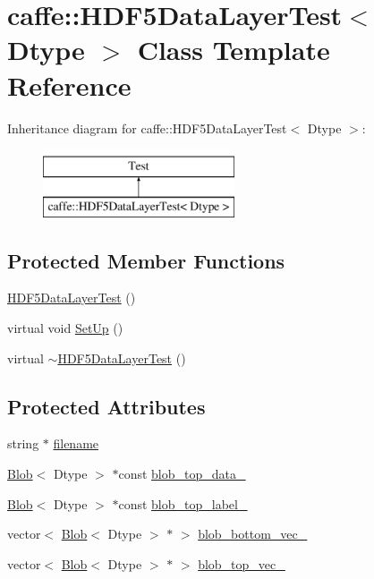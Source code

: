 \hypertarget{classcaffe_1_1_h_d_f5_data_layer_test}{\section{caffe\+:\+:H\+D\+F5\+Data\+Layer\+Test$<$ Dtype $>$ Class Template Reference}
\label{classcaffe_1_1_h_d_f5_data_layer_test}
}
Inheritance diagram for caffe\+:\+:H\+D\+F5\+Data\+Layer\+Test$<$ Dtype $>$\+:\begin{figure}[H]
\begin{center}
\leavevmode
\includegraphics[height=2.000000cm]{classcaffe_1_1_h_d_f5_data_layer_test}
\end{center}
\end{figure}
\subsection*{Protected Member Functions}
\begin{DoxyCompactItemize}
\item 
\hyperlink{classcaffe_1_1_h_d_f5_data_layer_test_a193e15cc2ccd1437aa0aa5096d5dfde6}{H\+D\+F5\+Data\+Layer\+Test} ()
\item 
virtual void \hyperlink{classcaffe_1_1_h_d_f5_data_layer_test_a87eaa2af48eba154aaf5a5429708c7b1}{Set\+Up} ()
\item 
virtual \hyperlink{classcaffe_1_1_h_d_f5_data_layer_test_a3a1a5bd011ab7f9514cb2fbe40612f7e}{$\sim$\+H\+D\+F5\+Data\+Layer\+Test} ()
\end{DoxyCompactItemize}
\subsection*{Protected Attributes}
\begin{DoxyCompactItemize}
\item 
string $\ast$ \hyperlink{classcaffe_1_1_h_d_f5_data_layer_test_a7f63b15d92f052d045c969e74ad8ed5d}{filename}
\item 
\hyperlink{classcaffe_1_1_blob}{Blob}$<$ Dtype $>$ $\ast$const \hyperlink{classcaffe_1_1_h_d_f5_data_layer_test_a4e051fd65360f35354b864e33ae74eaa}{blob\+\_\+top\+\_\+data\+\_\+}
\item 
\hyperlink{classcaffe_1_1_blob}{Blob}$<$ Dtype $>$ $\ast$const \hyperlink{classcaffe_1_1_h_d_f5_data_layer_test_afb89ea13ccf6f75de384f703c9444174}{blob\+\_\+top\+\_\+label\+\_\+}
\item 
vector$<$ \hyperlink{classcaffe_1_1_blob}{Blob}$<$ Dtype $>$ $\ast$ $>$ \hyperlink{classcaffe_1_1_h_d_f5_data_layer_test_a68f3f644d32f341c09cab346701df1e6}{blob\+\_\+bottom\+\_\+vec\+\_\+}
\item 
vector$<$ \hyperlink{classcaffe_1_1_blob}{Blob}$<$ Dtype $>$ $\ast$ $>$ \hyperlink{classcaffe_1_1_h_d_f5_data_layer_test_add8fb70dc419407a8e0ca8a78640c380}{blob\+\_\+top\+\_\+vec\+\_\+}
\end{DoxyCompactItemize}


